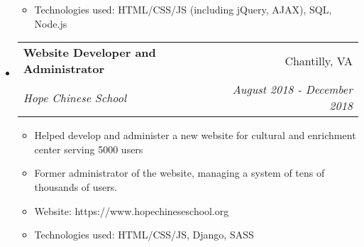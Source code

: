 \documentclass[letterpaper,10pt]{article}
\makeatletter
\newcommand{\resitem}[1]{\item #1 \vspace{-2pt}}
\newcommand{\ressubheading}[4]{
\begin{tabular*}{7.0in}{l@{\extracolsep{\fill}}r}
		\textbf{#1} & #2 \\
		\textit{#3} & \textit{#4} \\
\end{tabular*}\vspace{-6pt}}
\makeatother
\begin{document}
\begin{itemize}
\begin{itemize}
		\resitem{Technologies used: HTML/CSS/JS (including jQuery, AJAX), SQL, Node.js}
	\end{itemize}
\item
    \ressubheading{Website Developer and Administrator}{Chantilly, VA}{Hope Chinese School}{August 2018 - December 2018}
	\begin{itemize}
	    \resitem{Helped develop and administer a new website for cultural and enrichment center serving 5000 users}
		\resitem{Former administrator of the website, managing a system of tens of thousands of users.}
		\resitem{Website: https://www.hopechineseschool.org}
		\resitem{Technologies used: HTML/CSS/JS, Django, SASS}
	\end{itemize}
\end{itemize}
\end{document}
